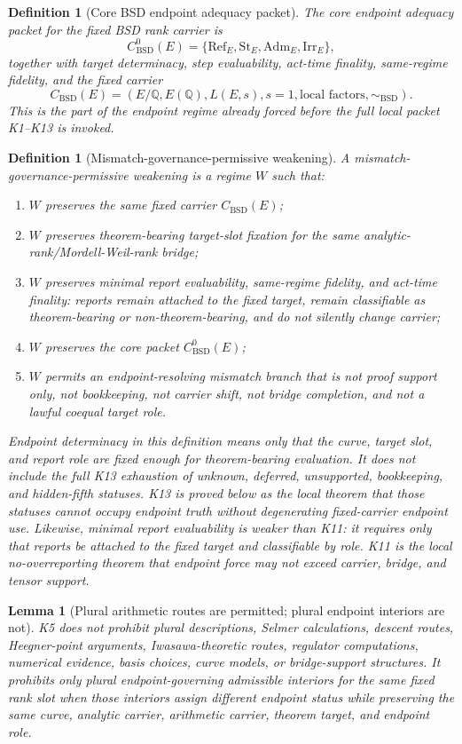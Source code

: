 \documentclass[11pt]{article}
\newtheorem{lemma}[theorem]{Lemma}
\newtheorem{definition}[theorem]{Definition}
\newcommand{\Q}{\mathbb{Q}}
\newcommand{\BSD}{\mathrm{BSD}}
\newcommand{\RefK}{\mathrm{Ref}}
\newcommand{\St}{\mathrm{St}}
\newcommand{\Adm}{\mathrm{Adm}}
\newcommand{\Irr}{\mathrm{Irr}}
\begin{document}
\begin{definition}[Core BSD endpoint adequacy packet]\label{def:core-bsd-packet}
The core endpoint adequacy packet for the fixed BSD rank carrier is
\[
C^0_{\BSD}(E)=\{\RefK_E,\St_E,\Adm_E,\Irr_E\},
\]
together with target determinacy, step evaluability, act-time finality, same-regime fidelity, and the fixed carrier
\[
C_{\BSD}(E)=(E/\Q,E(\Q),L(E,s),s=1,\text{local factors},\sim_{\BSD}).
\]
This is the part of the endpoint regime already forced before the full local packet K1--K13 is invoked.
\end{definition}

\begin{definition}[Mismatch-governance-permissive weakening]\label{def:mismatch-governance-weakening}
A mismatch-governance-permissive weakening is a regime $W$ such that:
\begin{enumerate}[label=(\roman*)]
\item $W$ preserves the same fixed carrier $C_{\BSD}(E)$;
\item $W$ preserves theorem-bearing target-slot fixation for the same analytic-rank/Mordell-Weil-rank bridge;
\item $W$ preserves minimal report evaluability, same-regime fidelity, and act-time finality: reports remain attached to the fixed target, remain classifiable as theorem-bearing or non-theorem-bearing, and do not silently change carrier;
\item $W$ preserves the core packet $C^0_{\BSD}(E)$;
\item $W$ permits an endpoint-resolving mismatch branch that is not proof support only, not bookkeeping, not carrier shift, not bridge completion, and not a lawful coequal target role.
\end{enumerate}
Endpoint determinacy in this definition means only that the curve, target slot, and report role are fixed enough for theorem-bearing evaluation. It does not include the full K13 exhaustion of unknown, deferred, unsupported, bookkeeping, and hidden-fifth statuses. K13 is proved below as the local theorem that those statuses cannot occupy endpoint truth without degenerating fixed-carrier endpoint use. Likewise, minimal report evaluability is weaker than K11: it requires only that reports be attached to the fixed target and classifiable by role. K11 is the local no-overreporting theorem that endpoint force may not exceed carrier, bridge, and tensor support.
\end{definition}

\begin{lemma}[Plural arithmetic routes are permitted; plural endpoint interiors are not]\label{lem:plural-routes-not-interiors}
K5 does not prohibit plural descriptions, Selmer calculations, descent routes, Heegner-point arguments, Iwasawa-theoretic routes, regulator computations, numerical evidence, basis choices, curve models, or bridge-support structures. It prohibits only plural endpoint-governing admissible interiors for the same fixed rank slot when those interiors assign different endpoint status while preserving the same curve, analytic carrier, arithmetic carrier, theorem target, and endpoint role.
\end{lemma}
\end{document}
